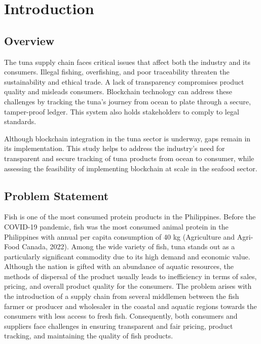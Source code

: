 \chapter{Introduction}
\label{sec:researchdesc}    %

\section{Overview}
\label{sec:overview}
The tuna supply chain faces critical issues that affect both the industry and its consumers. Illegal fishing, overfishing, and poor traceability threaten the sustainability and ethical trade. A lack of transparency compromises product quality and misleads consumers. Blockchain technology can address these challenges by tracking the tuna's journey from ocean to plate through a secure, tamper-proof ledger. This system also holds stakeholders to comply to legal standards.

\noindent Although blockchain integration in the tuna sector is underway, gaps remain in its implementation. This study helps to address the industry’s need for transparent and secure tracking of tuna products from ocean to consumer, while assessing the feasibility of implementing blockchain at scale in the seafood sector.


\section{Problem Statement}

Fish is one of the most consumed protein products in the Philippines. Before the COVID-19 pandemic, fish was the most consumed animal protein in the Philippines with annual per capita consumption of 40 kg (Agriculture and Agri-Food Canada, 2022). Among the wide variety of fish, tuna stands out as a particularly significant commodity due to its high demand and economic value. Although the nation is gifted with an abundance of aquatic resources, the methods of dispersal of the product usually leads to inefficiency in terms of sales, pricing, and overall product quality for the consumers. The problem arises with the introduction of a supply chain from several middlemen between the fish farmer or producer and wholesaler in the coastal and aquatic regions towards the consumers with less access to fresh fish. Consequently, both consumers and suppliers face challenges in ensuring transparent and fair pricing, product tracking, and maintaining the quality of fish products.



